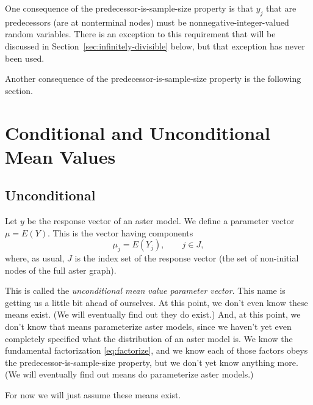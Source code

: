 One consequence of the predecessor-is-sample-size property is that $y_j$
that are predecessors (are at nonterminal nodes) must be
nonnegative-integer-valued random variables.
There is an exception to this requirement that will be discussed in
Section~\ref{sec:infinitely-divisible} below, but that exception has
never been used.

Another consequence of the predecessor-is-sample-size property is
the following section.

\section{Conditional and Unconditional Mean Values}
\label{sec:conditional-and-unconditional-mean-values}

\subsection{Unconditional}

Let $y$ be the response vector of an aster model.  We define a parameter
vector $\mu = E(Y)$.  This is the vector having components
\begin{equation} \label{eq:unconditional-mean-values}
   \mu_j = E(Y_j), \qquad j \in J,
\end{equation}
where, as usual, $J$ is the index set of the response vector (the set
of non-initial nodes of the full aster graph).

This is called the \emph{unconditional mean value parameter vector}.
This name is getting us a little bit ahead of ourselves.
At this point, we don't even know these means exist.
(We will eventually find out they do exist.)
And, at this point, we don't know that means parameterize aster models,
since we haven't yet even completely specified what the distribution
of an aster model is.  We know the fundamental factorization
\eqref{eq:factorize}, and we know each of those factors obeys the
predecessor-is-sample-size property, but we don't yet know anything more.
(We will eventually find out means do parameterize aster models.)

For now we will just assume these means exist.

